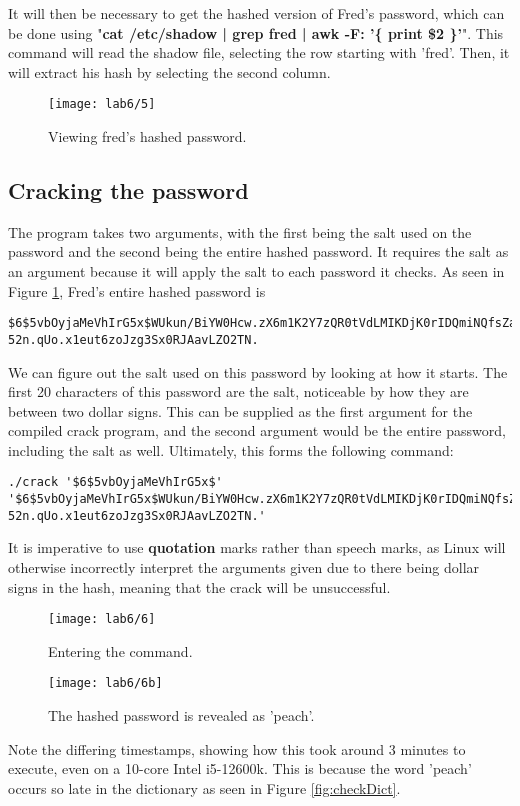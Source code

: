It will then be necessary to get the hashed version of Fred's password, which can be done using
"\textbf{cat /etc/shadow | grep fred | awk -F: '\{ print \$2 \}'}".
This command will read the shadow file, selecting the row starting with 'fred'.
Then, it will extract his hash by selecting the second column.

\begin{figure}[H]
    \centering
    \texttt{[image: lab6/5]}
    \caption{Viewing fred's hashed password.}
    \label{fig:viewFredHash}
\end{figure}

\subsection{Cracking the password}\label{subsec:cracking-the-password}
The program takes two arguments, with the first being the salt used on the password and the
second being the entire hashed password.
It requires the salt as an argument because it will apply the salt to each password it checks.
As seen in Figure \ref{fig:viewFredHash}, Fred's entire hashed password is

\begin{verbatim}
$6$5vbOyjaMeVhIrG5x$WUkun/BiYW0Hcw.zX6m1K2Y7zQR0tVdLMIKDjK0rIDQmiNQfsZa
52n.qUo.x1eut6zoJzg3Sx0RJAavLZO2TN.
\end{verbatim}

We can figure out the salt used on this password by looking at how it starts.
The first 20 characters of this password are the salt, noticeable by how they are between two dollar signs.
This can be supplied as the first argument for the compiled crack program, and the second argument would be the
entire password, including the salt as well.
Ultimately, this forms the following command:

\begin{verbatim}
./crack '$6$5vbOyjaMeVhIrG5x$'
'$6$5vbOyjaMeVhIrG5x$WUkun/BiYW0Hcw.zX6m1K2Y7zQR0tVdLMIKDjK0rIDQmiNQfsZa
52n.qUo.x1eut6zoJzg3Sx0RJAavLZO2TN.'
\end{verbatim}

It is imperative to use \textbf{quotation} marks rather than speech marks, as Linux will otherwise incorrectly
interpret the arguments given due to there being dollar signs in the hash, meaning that the crack will be
unsuccessful.

\begin{figure}[H]
    \centering
    \texttt{[image: lab6/6]}
    \caption{Entering the command.}
    \label{fig:cracking}
\end{figure}

\begin{figure}[H]
    \centering
    \texttt{[image: lab6/6b]}
    \caption{The hashed password is revealed as 'peach'.}
    \label{fig:cracked}
\end{figure}

Note the differing timestamps, showing how this took around 3 minutes to execute, even on a 10-core
Intel i5-12600k.
This is because the word 'peach' occurs so late in the dictionary as seen in Figure \ref{fig:checkDict}.


